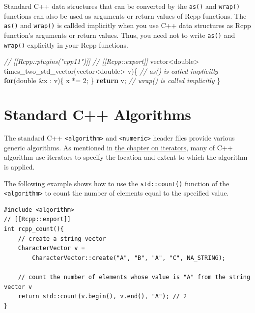 \documentclass[]{book}
\newenvironment{Shaded}{\begin{snugshade}}{\end{snugshade}}
\newcommand{\CommentTok}[1]{\textcolor[rgb]{0.56,0.35,0.01}{\textit{#1}}}
\newcommand{\ControlFlowTok}[1]{\textcolor[rgb]{0.13,0.29,0.53}{\textbf{#1}}}
\newcommand{\DataTypeTok}[1]{\textcolor[rgb]{0.13,0.29,0.53}{#1}}
\newcommand{\DecValTok}[1]{\textcolor[rgb]{0.00,0.00,0.81}{#1}}
\newcommand{\NormalTok}[1]{#1}
\begin{document}
Standard C++ data structures that can be converted by the \texttt{as()} and \texttt{wrap()} functions can also be used as arguments or return values of Rcpp functions. The \texttt{as()} and \texttt{wrap()} is callded implicitly when you use C++ data structures as Rcpp function's arguments or return values. Thus, you need not to write \texttt{as()} and \texttt{wrap()} explicitly in your Rcpp functions.

\begin{Shaded}
\begin{Highlighting}[]
\CommentTok{// [[Rcpp::plugins("cpp11")]]}
\CommentTok{// [[Rcpp::export]]}
\NormalTok{vector<}\DataTypeTok{double}\NormalTok{> times_two_std_vector(vector<}\DataTypeTok{double}\NormalTok{> v)\{ }\CommentTok{// as() is called implicitly}
    \ControlFlowTok{for}\NormalTok{(}\DataTypeTok{double}\NormalTok{ &x : v)\{}
\NormalTok{        x *= }\DecValTok{2}\NormalTok{;}
\NormalTok{    \}}
    \ControlFlowTok{return}\NormalTok{ v; }\CommentTok{// wrap() is called implicitly}
\NormalTok{\}}
\end{Highlighting}
\end{Shaded}

\hypertarget{standard-c-algorithms}{%
\section{Standard C++ Algorithms}\label{standard-c-algorithms}}

The standard C++ \texttt{\textless{}algorithm\textgreater{}} and \texttt{\textless{}numeric\textgreater{}} header files provide various generic algorithms. As mentioned in \href{290_iterator.html}{the chapter on iterators}, many of C++ algorithm use iterators to specify the location and extent to which the algorithm is applied.

The following example shows how to use the \texttt{std::count()} function of the \texttt{\textless{}algorithm\textgreater{}} to count the number of elements equal to the specified value.

\begin{verbatim}
#include <algorithm>
// [[Rcpp::export]]
int rcpp_count(){
    // create a string vector
    CharacterVector v =
        CharacterVector::create("A", "B", "A", "C", NA_STRING);

    // count the number of elements whose value is "A" from the string vector v
    return std::count(v.begin(), v.end(), "A"); // 2
}
\end{verbatim}
\end{document}
